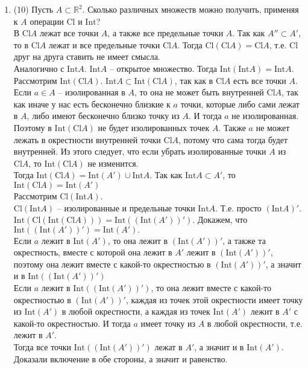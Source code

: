 \documentclass[a4paper]{article}
\def\Int{\mathrm{Int}}
\def\Cl{\mathrm{Cl}}
\begin{document}
\begin{enumerate}
    \item (10) Пусть $A\subset \mathbb R^2$. Сколько различных множеств можно получить, применяя к $A$ операции $\Cl$ и $\Int$?\\
    В $\Cl A$ лежат все точки $A$, а также все предельные точки $A$. Так как $A'' \subset A'$, то в $\Cl A$ лежат и все предельные точки $\Cl A$. Тогда $\Cl(\Cl A) = \Cl A$, т.е. $\Cl$ друг на друга ставить не имеет смысла.\\
    Аналогично с $\Int A$. $\Int A$ -- открытое множество. Тогда $\Int(\Int A) = \Int A$.\\
    Рассмотрим $\Int(\Cl A)$. $\Int A \subset \Int(\Cl A)$, так как в $\Cl A$ есть все точки $A$.\\
    Если $a \in A$ -- изолированная в $A$, то она не может быть внутренней $\Cl A$, так как иначе у нас есть бесконечно близкие к $a$ точки, которые либо сами лежат в $A$, либо имеют бесконечно близко точку из $A$. И тогда $a$ не изолированная. Поэтому в $\Int(\Cl A)$ не будет изолированных точек $A$. Также $a$ не может лежать в окрестности внутренней точки $\Cl A$, потому что сама тогда будет внутренней. Из этого следует, что если убрать изолированные точки $A$ из $\Cl A$, то $\Int (\Cl A)$ не изменится.\\
    Тогда $\Int(\Cl A) = \Int (A') \cup \Int A$. Так как $\Int A\subset A'$, то $\Int(\Cl A) = \Int (A')$\\
    Рассмотрим $\Cl(\Int A)$.\\
    $\Cl(\Int A)$ -- изолированные и предельные точки $\Int A$. Т.е. просто $(\Int A)'$.\\
    $\Int(\Cl(\Int(\Cl A))) = \Int((\Int(A'))')$. Докажем, что $\Int((\Int(A'))') = \Int(A').$\\
    Если $a$ лежит в $\Int(A')$, то она лежит в $(\Int(A'))'$, а также та окрестность, вместе с которой она лежит в  $A'$ лежит в $(\Int(A'))'$, поэтому она лежит вместе с какой-то окрестностью в $(\Int(A'))'$, а значит и в $\Int((\Int(A'))')$\\
    Если $a$ лежит в $\Int((\Int(A'))')$, то она лежит вместе с какой-то окрестностью в $(\Int (A'))'$, каждая из точек этой окрестности имеет точку из $\Int (A')$ в любой окрестности, а каждая из точек $\Int(A')$ лежит в $A'$ с какой-то окрестностью. И тогда $a$ имеет точку из $A$ в любой окрестности, т.е. лежит в $A'$.\\
    Тогда все точки $\Int((\Int(A'))')$ лежат в $A'$, а значит и в $\Int(A')$. Доказали включение в обе стороны, а значит и равенство.\\

\end{enumerate}
\end{document}
